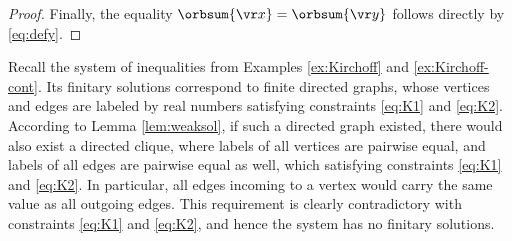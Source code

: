 \begin{proof}

Finally, 
the equality $\orbsum {\vr x} = \orbsum {\vr y}$ follows directly by \eqref{eq:defy}.
%
\end{proof}

\begin{slexample}
\label{ex:Kirchoff-cont-cont}
Recall the system of inequalities from Examples \ref{ex:Kirchoff} and \ref{ex:Kirchoff-cont}.
Its finitary solutions correspond to finite directed graphs, whose vertices and edges are labeled
by real numbers satisfying constraints \eqref{eq:K1} and \eqref{eq:K2}.
According to Lemma \ref{lem:weaksol}, if such a directed graph existed,  
there would also exist a directed clique, where labels of all vertices are pairwise equal, 
and labels of all edges are pairwise equal as well, which satisfying constraints \eqref{eq:K1} and \eqref{eq:K2}.
In particular, all edges incoming to a vertex would carry the same value as all outgoing edges.
This requirement is clearly contradictory with constraints \eqref{eq:K1} and \eqref{eq:K2},
and hence the system has no finitary solutions.
\end{slexample}

%
%

